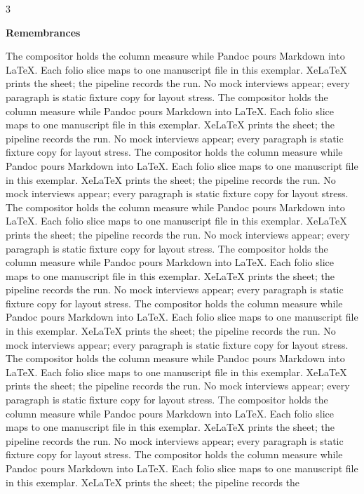 \documentclass[
]{article}
\begin{document}
\begin{multicols}{3}

\textbf{Remembrances}

The compositor holds the column measure while Pandoc pours Markdown into
LaTeX. Each folio slice maps to one manuscript file in this exemplar.
XeLaTeX prints the sheet; the pipeline records the run. No mock
interviews appear; every paragraph is static fixture copy for layout
stress. The compositor holds the column measure while Pandoc pours
Markdown into LaTeX. Each folio slice maps to one manuscript file in
this exemplar. XeLaTeX prints the sheet; the pipeline records the run.
No mock interviews appear; every paragraph is static fixture copy for
layout stress. The compositor holds the column measure while Pandoc
pours Markdown into LaTeX. Each folio slice maps to one manuscript file
in this exemplar. XeLaTeX prints the sheet; the pipeline records the
run. No mock interviews appear; every paragraph is static fixture copy
for layout stress. The compositor holds the column measure while Pandoc
pours Markdown into LaTeX. Each folio slice maps to one manuscript file
in this exemplar. XeLaTeX prints the sheet; the pipeline records the
run. No mock interviews appear; every paragraph is static fixture copy
for layout stress. The compositor holds the column measure while Pandoc
pours Markdown into LaTeX. Each folio slice maps to one manuscript file
in this exemplar. XeLaTeX prints the sheet; the pipeline records the
run. No mock interviews appear; every paragraph is static fixture copy
for layout stress. The compositor holds the column measure while Pandoc
pours Markdown into LaTeX. Each folio slice maps to one manuscript file
in this exemplar. XeLaTeX prints the sheet; the pipeline records the
run. No mock interviews appear; every paragraph is static fixture copy
for layout stress. The compositor holds the column measure while Pandoc
pours Markdown into LaTeX. Each folio slice maps to one manuscript file
in this exemplar. XeLaTeX prints the sheet; the pipeline records the
run. No mock interviews appear; every paragraph is static fixture copy
for layout stress. The compositor holds the column measure while Pandoc
pours Markdown into LaTeX. Each folio slice maps to one manuscript file
in this exemplar. XeLaTeX prints the sheet; the pipeline records the
run. No mock interviews appear; every paragraph is static fixture copy
for layout stress. The compositor holds the column measure while Pandoc
pours Markdown into LaTeX. Each folio slice maps to one manuscript file
in this exemplar. XeLaTeX prints the sheet; the pipeline records the

\end{multicols}
\end{document}

